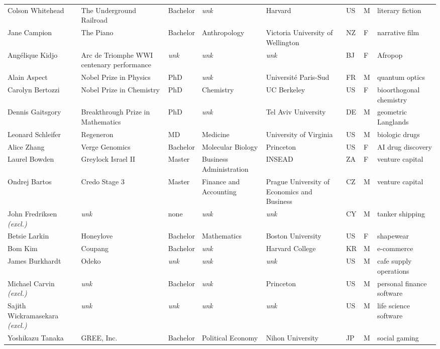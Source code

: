 \documentclass[11pt]{article}
\begin{document}
\begin{longtable}{@{}p{2.4cm}p{2.5cm}p{1.35cm}p{1.9cm}p{2.1cm}p{0.5cm}p{0.45cm}p{2.2cm}@{}}
Colson Whitehead & The Underground Railroad & Bachelor & \textit{unk} & Harvard & US & M & literary fiction \\
Jane Campion & The Piano & Bachelor & Anthropology & Victoria University of Wellington & NZ & F & narrative film \\
Angélique Kidjo & Arc de Triomphe WWI centenary performance & \textit{unk} & \textit{unk} & \textit{unk} & BJ & F & Afropop \\
Alain Aspect & Nobel Prize in Physics & PhD & \textit{unk} & Université Paris-Sud & FR & M & quantum optics \\
Carolyn Bertozzi & Nobel Prize in Chemistry & PhD & Chemistry & UC Berkeley & US & F & bioorthogonal chemistry \\
Dennis Gaitsgory & Breakthrough Prize in Mathematics & PhD & \textit{unk} & Tel Aviv University & DE & M & geometric Langlands \\
Leonard Schleifer & Regeneron & MD & Medicine & University of Virginia & US & M & biologic drugs \\
Alice Zhang & Verge Genomics & Bachelor & Molecular Biology & Princeton & US & F & AI drug discovery \\
Laurel Bowden & Greylock Israel II & Master & Business Administration & INSEAD & ZA & F & venture capital \\
Ondrej Bartos & Credo Stage 3 & Master & Finance and Accounting & Prague University of Economics and Business & CZ & M & venture capital \\
John Fredriksen \textit{\scriptsize(excl.)} & \textit{unk} & none & \textit{unk} & \textit{unk} & CY & M & tanker shipping \\
Betsie Larkin & Honeylove & Bachelor & Mathematics & Boston University & US & F & shapewear \\
Bom Kim & Coupang & Bachelor & \textit{unk} & Harvard College & KR & M & e-commerce \\
James Burkhardt & Odeko & \textit{unk} & \textit{unk} & \textit{unk} & US & M & cafe supply operations \\
Michael Carvin \textit{\scriptsize(excl.)} & \textit{unk} & Bachelor & \textit{unk} & Princeton & US & M & personal finance software \\
Sajith Wickramasekara \textit{\scriptsize(excl.)} & \textit{unk} & \textit{unk} & \textit{unk} & \textit{unk} & US & M & life science software \\
Yoshikazu Tanaka & GREE, Inc. & Bachelor & Political Economy & Nihon University & JP & M & social gaming \\

\end{longtable}
\end{document}
